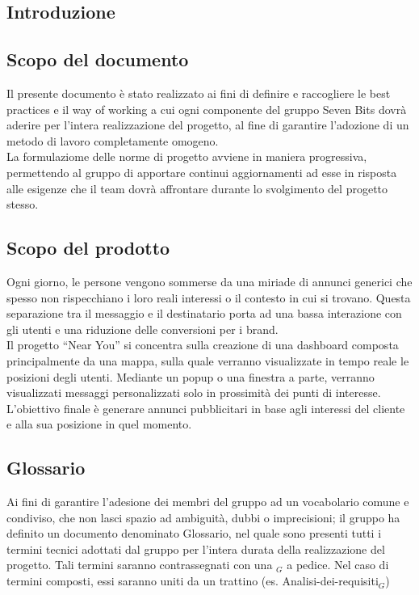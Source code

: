 \documentclass[10pt]{article}
\begin{document}
\newpage
\tableofcontents
\newpage
\listoffigures

\newpage
\begin{justify}

\section{Introduzione}
    \subsection{Scopo del documento}
    Il presente documento è stato realizzato ai fini di definire e raccogliere le best practices e il way of working a cui ogni componente del gruppo Seven Bits dovrà aderire per l'intera realizzazione del progetto, al fine di garantire l'adozione di un metodo di lavoro completamente omogeno.\\
    La formulaziome delle norme di progetto avviene in maniera progressiva, permettendo al gruppo di apportare continui aggiornamenti ad esse in risposta alle esigenze che il team dovrà affrontare durante lo svolgimento del progetto stesso.\\ 

    \subsection{Scopo del prodotto}
    Ogni giorno, le persone vengono sommerse da una miriade di annunci generici che spesso non rispecchiano i loro reali interessi o il contesto in cui si trovano. Questa separazione tra il messaggio e il destinatario porta ad una bassa interazione con gli utenti e una riduzione delle conversioni per i brand.\\
    Il progetto “Near You” si concentra sulla creazione di una dashboard composta principalmente da una mappa, sulla quale verranno visualizzate in tempo reale le posizioni degli utenti. Mediante un popup o una finestra a parte, verranno visualizzati messaggi personalizzati solo in prossimità dei punti di interesse.\\
    L'obiettivo finale è generare annunci pubblicitari in base agli interessi del cliente e alla sua posizione in quel momento.\\
    
    \subsection{Glossario}
    Ai fini di garantire l'adesione dei membri del gruppo ad un vocabolario comune e condiviso, che non lasci spazio ad ambiguità, dubbi o imprecisioni; il gruppo ha definito un documento denominato Glossario, nel quale sono presenti tutti i termini tecnici adottati dal gruppo per l'intera durata della realizzazione del progetto. Tali termini saranno contrassegnati con una $_G$ a pedice. Nel caso di termini composti, essi saranno uniti da un trattino (es. Analisi-dei-requisiti$_G$)


\end{justify}
\end{document}
